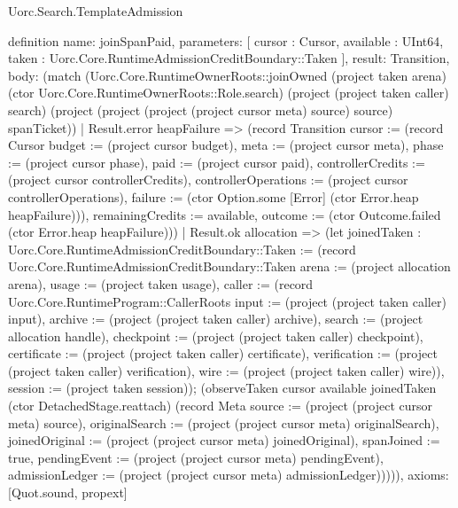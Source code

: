 \begin{lexlean}{Uorc.Search.TemplateAdmission}
\begin{semanticmodule}
definition{
  name: joinSpanPaid,
  parameters: [
    cursor : Cursor,
    available : UInt64,
    taken : Uorc.Core.RuntimeAdmissionCreditBoundary::Taken
  ],
  result: Transition,
  body: (match (Uorc.Core.RuntimeOwnerRoots::joinOwned (project taken arena) (ctor Uorc.Core.RuntimeOwnerRoots::Role.search) (project (project taken caller) search) (project (project (project (project cursor meta) source) source) spanTicket))
    | Result.error heapFailure => (record Transition {cursor := (record Cursor {budget := (project cursor budget), meta := (project cursor meta), phase := (project cursor phase), paid := (project cursor paid), controllerCredits := (project cursor controllerCredits), controllerOperations := (project cursor controllerOperations), failure := (ctor Option.some [Error] (ctor Error.heap heapFailure))}), remainingCredits := available, outcome := (ctor Outcome.failed (ctor Error.heap heapFailure))})
    | Result.ok allocation => (let joinedTaken : Uorc.Core.RuntimeAdmissionCreditBoundary::Taken := (record Uorc.Core.RuntimeAdmissionCreditBoundary::Taken {arena := (project allocation arena), usage := (project taken usage), caller := (record Uorc.Core.RuntimeProgram::CallerRoots {input := (project (project taken caller) input), archive := (project (project taken caller) archive), search := (project allocation handle), checkpoint := (project (project taken caller) checkpoint), certificate := (project (project taken caller) certificate), verification := (project (project taken caller) verification), wire := (project (project taken caller) wire)}), session := (project taken session)}); (observeTaken cursor available joinedTaken (ctor DetachedStage.reattach) (record Meta {source := (project (project cursor meta) source), originalSearch := (project (project cursor meta) originalSearch), joinedOriginal := (project (project cursor meta) joinedOriginal), spanJoined := true, pendingEvent := (project (project cursor meta) pendingEvent), admissionLedger := (project (project cursor meta) admissionLedger)})))),
  axioms: [Quot.sound, propext]
}


\end{semanticmodule}
\end{lexlean}
